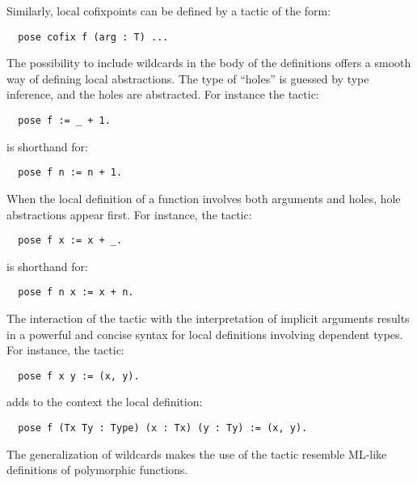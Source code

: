 Similarly, local cofixpoints can be defined by a tactic of the form:
\begin{lstlisting}
  pose cofix f (arg : T) ...
\end{lstlisting}

The possibility to include wildcards in the body of the definitions
 offers a smooth
way of defining local abstractions. The type of ``holes'' is
guessed by type inference, and the holes are abstracted.
For instance the tactic:
\begin{lstlisting}
  pose f := _ + 1.
\end{lstlisting}
is shorthand for:
\begin{lstlisting}
  pose f n := n + 1.
\end{lstlisting}

When the local definition of a function involves both arguments and
holes, hole abstractions appear first. For instance, the
tactic:
\begin{lstlisting}
  pose f x := x + _.
\end{lstlisting}
is shorthand for:
\begin{lstlisting}
  pose f n x := x + n.
\end{lstlisting}


The interaction of the  tactic with the interpretation of
implicit arguments results in a powerful and concise syntax for local
definitions involving dependent types.
For instance, the tactic:
\begin{lstlisting}
  pose f x y := (x, y).
\end{lstlisting}
adds to the context the local definition:
\begin{lstlisting}
  pose f (Tx Ty : Type) (x : Tx) (y : Ty) := (x, y).
\end{lstlisting}
The generalization of wildcards makes the use of the  tactic
resemble ML-like definitions of polymorphic functions.




